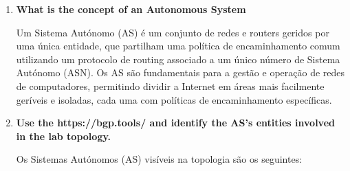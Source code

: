 \documentclass[11pt,english, openright, oneside]{book}
\begin{document}
\begin{enumerate}
  \item \textbf{What is the concept of an Autonomous System} 
  \vspace{0.2cm}

  Um Sistema Autónomo (AS) é um conjunto de redes e routers geridos por uma única entidade, que partilham uma política de encaminhamento comum utilizando um protocolo de routing associado a um único número de Sistema Autónomo (ASN). Os AS são fundamentais para a gestão e operação de redes de computadores, permitindo dividir a Internet em áreas mais facilmente geríveis e isoladas, cada uma com políticas de encaminhamento específicas.
  \vspace{0.2cm}

  \newpage
  \item \textbf{Use the https://bgp.tools/ and identify the AS’s entities involved in the lab topology.} 
  \vspace{0.2cm}

  Os Sistemas Autónomos (AS) visíveis na topologia são os seguintes:
  \vspace{0.2cm}


\end{enumerate}
\end{document}

